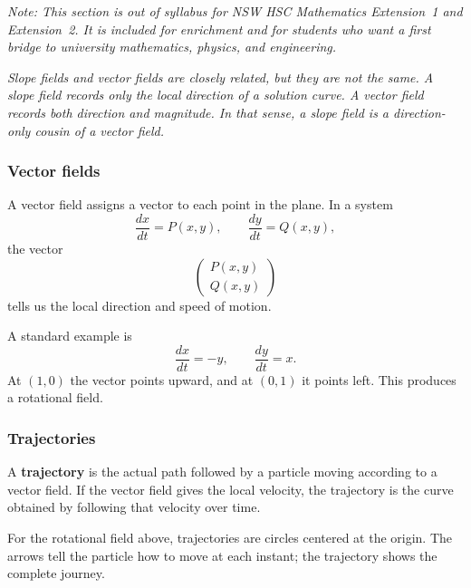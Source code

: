 \textit{Note: This section is out of syllabus for NSW HSC Mathematics Extension~1 and Extension~2. It is included for enrichment and for students who want a first bridge to university mathematics, physics, and engineering.}

\medskip
\textit{Slope fields and vector fields are closely related, but they are not the same. A slope field records only the local direction of a solution curve. A vector field records both direction and magnitude. In that sense, a slope field is a direction-only cousin of a vector field.}

\subsubsection*{Vector fields}
A vector field assigns a vector to each point in the plane. In a system
\[
\frac{dx}{dt}=P(x,y), \qquad \frac{dy}{dt}=Q(x,y),
\]
the vector
\[
\begin{pmatrix} P(x,y) \\ Q(x,y) \end{pmatrix}
\]
tells us the local direction and speed of motion.

A standard example is
\[
\frac{dx}{dt}=-y, \qquad \frac{dy}{dt}=x.
\]
At $(1,0)$ the vector points upward, and at $(0,1)$ it points left. This produces a rotational field.

\begin{center}
\end{center}

\subsubsection*{Trajectories}
A \textbf{trajectory} is the actual path followed by a particle moving according to a vector field. If the vector field gives the local velocity, the trajectory is the curve obtained by following that velocity over time.

For the rotational field above, trajectories are circles centered at the origin. The arrows tell the particle how to move at each instant; the trajectory shows the complete journey.

